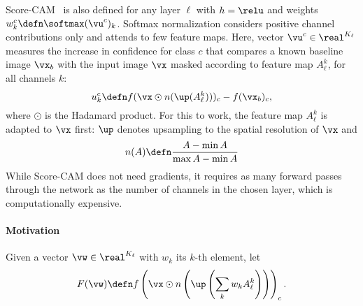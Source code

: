Score-CAM~\cite{wang2020score} is also defined for any layer $\ell$ with $h = \relu$ and weights $w^c_k \defn \softmax(\vu^c)_k$.  Softmax normalization considers positive channel contributions only and attends to few feature maps.
Here, vector $\vu^c \in \real^{K_\ell}$ measures the increase in confidence for class $c$ that compares a known baseline image $\vx_b$ with the input image $\vx$ masked according to feature map $A^k_\ell$, for all channels $k$:
\begin{equation}
	u^c_k \defn f(\vx \odot n(\up(A^k_\ell)))_c - f(\vx_b)_c,
\label{eq:s-cam}
\end{equation}
where $\odot$ is the Hadamard product. For this to work, the feature map $A^k_\ell$ is adapted to $\vx$ first: $\up$ denotes upsampling to the spatial resolution of $\vx$ and
\begin{equation}
	n(A) \defn \frac{A - \min A}{\max A - \min A}
\label{eq:norm}
\end{equation}
 While Score-CAM does not need gradients, it requires as many forward passes through the network as the number of channels in the chosen layer, which is computationally expensive.


\paragraph{Motivation}
\label{sec:motiv}

 Given a vector $\vw \in \real^{K_\ell}$ with $w_k$ its $k$-th element, let
\begin{equation}
	F(\vw) \defn f \left( \vx \odot n \left( \up \left(
		\displaystyle\sum_k w_k A^k_\ell
	\right) \right) \right)_c.
\label{eq:s-obj}
\end{equation}

